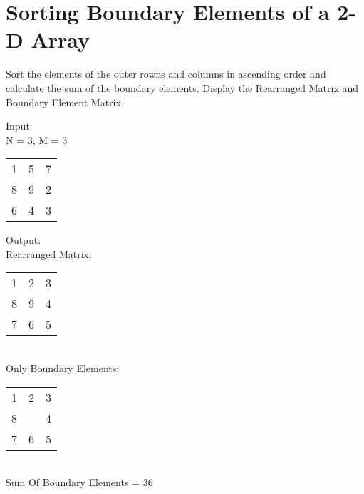 \documentclass[ProgrammingAssignment.tex]{subfiles}
\begin{document}
\section{Sorting Boundary Elements of a 2-D Array}
Sort the elements of the outer rowns and columns in ascending order and calculate the sum of the boundary elements. Display the Rearranged Matrix and Boundary Element Matrix.

Input:\\
N = 3, M = 3\\
\begin{tabular}{c c c}
1 & 5 & 7\\
8 & 9 & 2\\
6 & 4 & 3
\end{tabular}

Output:\\
Rearranged Matrix:\\
\begin{tabular}{c c c}
1 &	2 &	3	\\
8 &	9 &	4	\\
7 &	6 &	5	\\
\end{tabular}\\
Only Boundary Elements: \\
\begin{tabular}{c c c}
1 &	2 &	3\\
8 &	  & 4\\
7 &	6 &	5\\
\end{tabular}\\
Sum Of Boundary Elements = 36
\end{document}
